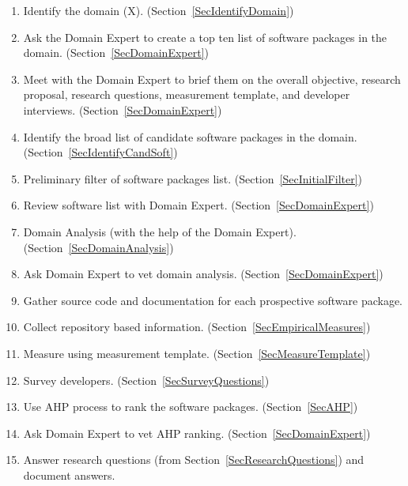 \documentclass[letterpaper,cleveref]{lipics-v2019}
\newcommand{\authornote}[3]{\textcolor{#1}{[#3 ---#2]}}
\newcommand{\authornote}[3]{}
\newcommand{\wss}[1]{\authornote{blue}{SS}{#1}} %
\begin{document}
\begin{enumerate}
\item Identify the domain (X). (Section~\ref{SecIdentifyDomain})
\item Ask the Domain Expert to create a top ten list of software packages in the
  domain. (Section~\ref{SecDomainExpert})
\item Meet with the Domain Expert to brief them on the overall objective,
  research proposal, research questions, measurement template, and developer
  interviews. (Section~\ref{SecDomainExpert}) \label{StepMeeting}
\item Identify the broad list of candidate software packages in the domain.
  (Section~\ref{SecIdentifyCandSoft})
\item Preliminary filter of software packages list.
  (Section~\ref{SecInitialFilter})
\item Review software list with Domain Expert. (Section~\ref{SecDomainExpert})
\item Domain Analysis (with the help of the Domain Expert).
(Section~\ref{SecDomainAnalysis})
\item Ask Domain Expert to vet domain analysis.
  (Section~\ref{SecDomainExpert})
\item Gather source code and documentation for each prospective software
  package.
\item Collect repository based information. (Section~\ref{SecEmpiricalMeasures})
\item Measure using measurement template. (Section~\ref{SecMeasureTemplate})
\item Survey developers. (Section~\ref{SecSurveyQuestions})
\item Use AHP process to rank the software packages. (Section~\ref{SecAHP})
\item Ask Domain Expert to vet AHP ranking. (Section~\ref{SecDomainExpert})
\item Answer research questions (from Section~\ref{SecResearchQuestions}) and
document answers.
\end{enumerate}

\end{document}
